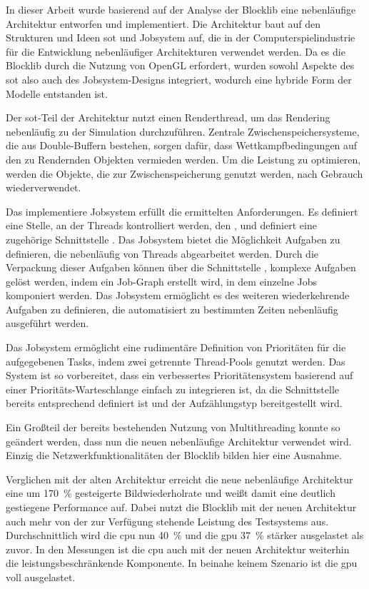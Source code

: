 In dieser Arbeit wurde basierend auf der Analyse der Blocklib eine nebenläufige Architektur entworfen und implementiert. Die Architektur baut auf den Strukturen und Ideen \acl{sot} und Jobsystem auf, die in der Computerspielindustrie für die Entwicklung nebenläufiger Architekturen verwendet werden. Da es die Blocklib durch die Nutzung von OpenGL erfordert, wurden sowohl Aspekte des \ac{sot} also auch des Jobsystem-Designs integriert, wodurch eine hybride Form der Modelle entstanden ist.

Der \ac{sot}-Teil der Architektur nutzt einen Renderthread, um das Rendering nebenläufig zu der Simulation durchzuführen. Zentrale Zwischenspeichersysteme, die aus Double-Buffern bestehen, sorgen dafür, dass Wettkampfbedingungen auf den zu Rendernden Objekten vermieden werden. Um die Leistung zu optimieren, werden die Objekte, die zur Zwischenspeicherung genutzt werden, nach Gebrauch wiederverwendet.

Das implementiere Jobsystem erfüllt die ermittelten Anforderungen. Es definiert eine Stelle, an der Threads kontrolliert werden, den , und definiert eine zugehörige Schnittstelle . Das Jobsystem bietet die Möglichkeit Aufgaben zu definieren, die nebenläufig von Threads abgearbeitet werden. Durch die Verpackung dieser Aufgaben können über die Schnittstelle , komplexe Aufgaben gelöst werden, indem ein Job-Graph erstellt wird, in dem einzelne Jobs komponiert werden. Das Jobsystem ermöglicht es des weiteren wiederkehrende Aufgaben zu definieren, die automatisiert zu bestimmten Zeiten nebenläufig ausgeführt werden.

Das Jobsystem ermöglicht eine rudimentäre Definition von Prioritäten für die aufgegebenen Tasks, indem zwei getrennte Thread-Pools genutzt werden. Das System ist so vorbereitet, dass ein verbessertes Prioritätensystem basierend auf einer Prioritäts-Warteschlange einfach zu integrieren ist, da die Schnittstelle  bereits entsprechend definiert ist und der Aufzählungstyp  bereitgestellt wird.

Ein Großteil der bereits bestehenden Nutzung von Multithreading konnte so geändert werden, dass nun die neuen nebenläufige Architektur verwendet wird. Einzig die Netzwerkfunktionalitäten der Blocklib bilden hier eine Ausnahme.

Verglichen mit der alten Architektur erreicht die neue nebenläufige Architektur eine um \SI{170}{\percent} gesteigerte Bildwiederholrate und weißt damit eine deutlich gestiegene Performance auf. Dabei nutzt die Blocklib mit der neuen Architektur auch mehr von der zur Verfügung stehende Leistung des Testsystems aus. Durchschnittlich wird die \ac{cpu} nun \SI{40}{\percent} und die \ac{gpu} \SI{37}{\percent} stärker ausgelastet als zuvor. In den Messungen ist die \ac{cpu} auch mit der neuen Architektur weiterhin die leistungsbeschränkende Komponente. In beinahe keinem Szenario ist die \ac{gpu} voll ausgelastet.